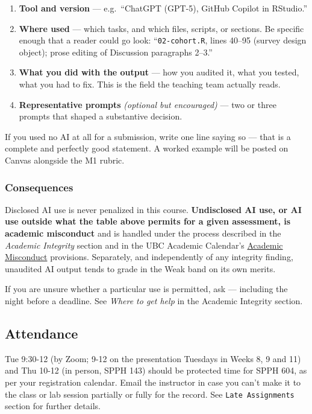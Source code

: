 \documentclass[
]{article}
\providecommand{\tightlist}{%
  \setlength{\itemsep}{0pt}\setlength{\parskip}{0pt}}
\begin{document}
\begin{enumerate}
\def\labelenumi{\arabic{enumi}.}
\tightlist
\item
  \textbf{Tool and version} --- e.g.~``ChatGPT (GPT-5), GitHub Copilot
  in RStudio.''
\item
  \textbf{Where used} --- which tasks, and which files, scripts, or
  sections. Be specific enough that a reader could go look:
  ``\texttt{02-cohort.R}, lines 40--95 (survey design object); prose
  editing of Discussion paragraphs 2--3.''
\item
  \textbf{What you did with the output} --- how you audited it, what you
  tested, what you had to fix. This is the field the teaching team
  actually reads.
\item
  \textbf{Representative prompts} \emph{(optional but encouraged)} ---
  two or three prompts that shaped a substantive decision.
\end{enumerate}

If you used no AI at all for a submission, write one line saying so ---
that is a complete and perfectly good statement. A worked example will
be posted on Canvas alongside the M1 rubric.

\subsubsection{Consequences}\label{consequences}

Disclosed AI use is never penalized in this course. \textbf{Undisclosed
AI use, or AI use outside what the table above permits for a given
assessment, is academic misconduct} and is handled under the process
described in the \emph{Academic Integrity} section and in the UBC
Academic Calendar's
\href{https://vancouver.calendar.ubc.ca/campus-wide-policies-and-regulations/student-conduct-and-discipline/discipline-academic-misconduct}{Academic
Misconduct} provisions. Separately, and independently of any integrity
finding, unaudited AI output tends to grade in the Weak band on its own
merits.

If you are unsure whether a particular use is permitted, ask ---
including the night before a deadline. See \emph{Where to get help} in
the Academic Integrity section.

\subsection{Attendance}\label{attendance}

Tue 9:30-12 (by Zoom; 9-12 on the presentation Tuesdays in Weeks 8, 9
and 11) and Thu 10-12 (in person, SPPH 143) should be protected time for
SPPH 604, as per your registration calendar. Email the instructor in
case you can't make it to the class or lab session partially or fully
for the record. See \texttt{Late\ Assignments} section for further
details.
\end{document}
